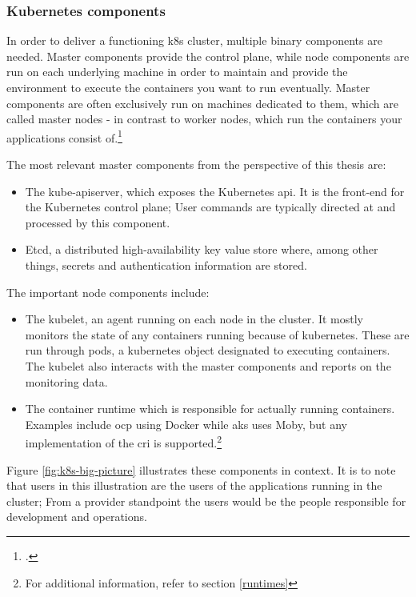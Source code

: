 \subsubsection{Kubernetes components} \label{k8sComponents}

In order to deliver a functioning \gls{k8s} cluster, multiple binary components are needed.
Master components provide the control plane, while node components are run on each underlying machine in order to maintain and provide the environment to execute the containers you want to run eventually.
Master components are often exclusively run on machines dedicated to them, which are called master nodes - in contrast to worker nodes, which run the containers your applications consist of.\footcite[][, section 'Master Components']{k8sComponents}

The most relevant master components from the perspective of this thesis are:
\begin{itemize}

\item The kube-apiserver, which exposes the Kubernetes \gls{api}. It is the front-end for the Kubernetes control plane; User commands are typically directed at and processed by this component.

\item Etcd, a distributed high-availability key value store where, among other things, secrets and authentication information are stored.

\end{itemize}

The important node components include:
\begin{itemize}

\item The kubelet, an agent running on each node in the cluster. It mostly monitors the state of any containers running because of kubernetes. These are run through pods, a kubernetes object designated to executing containers. The kubelet also interacts with the master components and reports on the monitoring data.

\item The container runtime which is responsible for actually running containers. Examples include \gls{ocp} using Docker while \gls{aks} uses Moby, but any implementation of the \gls{cri} is supported.\footnote{For additional information, refer to section \ref{runtimes}} 

\end{itemize}

Figure \ref{fig:k8s-big-picture} illustrates these components in context. It is to note that users in this illustration are the users of the applications running in the cluster; From a provider standpoint the users would be the people responsible for development and operations.

